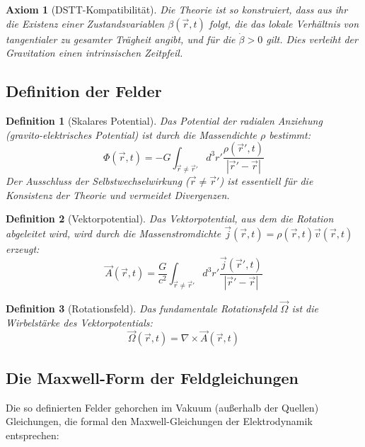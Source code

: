 \documentclass[12pt,a4paper]{article}
\newtheorem{axiom}{Axiom}[section]
\newtheorem{definition}{Definition}[section]
\begin{document}
\begin{axiom}[DSTT-Kompatibilität]
Die Theorie ist so konstruiert, dass aus ihr die Existenz einer Zustandsvariablen $\beta(\vec{r}, t)$ folgt, die das lokale Verhältnis von tangentialer zu gesamter Trägheit angibt, und für die $\dot{\beta} > 0$ gilt. Dies verleiht der Gravitation einen intrinsischen Zeitpfeil.
\end{axiom}

\subsection{Definition der Felder}

\begin{definition}[Skalares Potential]
Das Potential der radialen Anziehung (gravito-elektrisches Potential) ist durch die Massendichte $\rho$ bestimmt:
\begin{equation}
\Phi(\vec{r}, t) = -G \int_{\vec{r} \neq \vec{r}'} d^3 r' \frac{\rho(\vec{r}', t)}{|\vec{r}' - \vec{r}|}
\end{equation}
Der Ausschluss der Selbstwechselwirkung ($\vec{r} \neq \vec{r}'$) ist essentiell für die Konsistenz der Theorie und vermeidet Divergenzen.
\end{definition}

\begin{definition}[Vektorpotential]
Das Vektorpotential, aus dem die Rotation abgeleitet wird, wird durch die Massenstromdichte $\vec{j}(\vec{r}, t) = \rho(\vec{r}, t)\vec{v}(\vec{r}, t)$ erzeugt:
\begin{equation}
\vec{A}(\vec{r}, t) = \frac{G}{c^2} \int_{\vec{r} \neq \vec{r}'} d^3 r' \frac{\vec{j}(\vec{r}', t)}{|\vec{r}' - \vec{r}|}
\end{equation}
\end{definition}

\begin{definition}[Rotationsfeld]
Das fundamentale Rotationsfeld $\vec{\Omega}$ ist die Wirbelstärke des Vektorpotentials:
\begin{equation}
\vec{\Omega}(\vec{r}, t) = \nabla \times \vec{A}(\vec{r}, t)
\end{equation}
\end{definition}

\subsection{Die Maxwell-Form der Feldgleichungen}

Die so definierten Felder gehorchen im Vakuum (außerhalb der Quellen) Gleichungen, die formal den Maxwell-Gleichungen der Elektrodynamik entsprechen:
\end{document}
